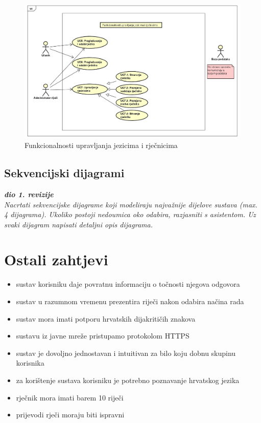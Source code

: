 					\begin{figure}[H]
						\includegraphics[scale=0.34]{dijagrami/dijagram3.jpg} 
						\centering
						\caption{Funkcionalnosti upravljanja jezicima i rječnicima}
						\label{fig:dijagram3}
					\end{figure}	
				
			\subsection{Sekvencijski dijagrami}
				
				\textbf{\textit{dio 1. revizije}}\\
				
				\textit{Nacrtati sekvencijske dijagrame koji modeliraju najvažnije dijelove sustava (max. 4 dijagrama). Ukoliko postoji nedoumica oko odabira, razjasniti s asistentom. Uz svaki dijagram napisati detaljni opis dijagrama.}
				\eject
	
				\section{Ostali zahtjevi}

				\begin{itemize}
					\item sustav korisniku daje povratnu informaciju o točnosti njegova odgovora
					\item sustav u razumnom vremenu prezentira riječi nakon odabira načina rada
					\item sustav mora imati potporu hrvatskih dijakritičih znakova
					\item sustavu iz javne mreže pristupamo protokolom HTTPS
					\item sustav je dovoljno jednostavan i intuitivan za bilo koju dobnu skupinu korisnika 
					\item za korištenje sustava korisniku je potrebno poznavanje hrvatskog jezika
					\item rječnik mora imati barem 10 riječi
					\item prijevodi rječi moraju biti ispravni
				\end{itemize}
			 
			 
			 
	